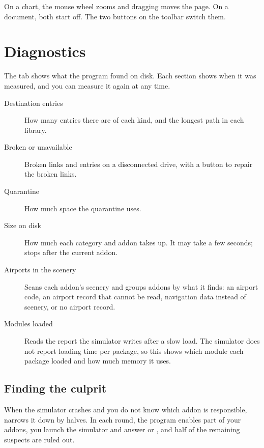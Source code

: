 \documentclass[11pt,a4paper]{article}
\begin{document}
On a chart, the mouse wheel zooms and dragging moves the page. On a document,
both start off. The two buttons on the toolbar switch them.

\section{Diagnostics}

The  tab shows what the program found on disk. Each section
shows when it was measured, and you can measure it again at any time.


\begin{description}
  \item[Destination entries] How many entries there are of each kind, and the
    longest path in each library.
  \item[Broken or unavailable] Broken links and entries on a disconnected
    drive, with a button to repair the broken links.
  \item[Quarantine] How much space the quarantine uses.
  \item[Size on disk] How much each category and addon takes up. It may take a
    few seconds;  stops after the current addon.
  \item[Airports in the scenery] Scans each addon's scenery and groups addons
    by what it finds: an airport code, an airport record that cannot be read,
    navigation data instead of scenery, or no airport record.
  \item[Modules loaded] Reads the report the simulator writes after a slow
    load. The simulator does not report loading time per package, so this
    shows which module each package loaded and how much memory it uses.
\end{description}

\subsection{Finding the culprit}

When the simulator crashes and you do not know which addon is responsible,
 narrows it down by halves. In each round, the program
enables part of your addons, you launch the simulator and answer 
or , and half of the remaining suspects are ruled out.
\end{document}
